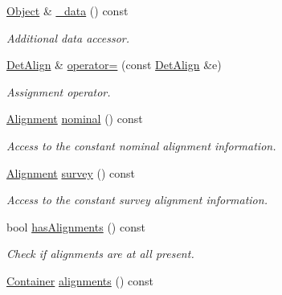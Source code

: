 \begin{DoxyCompactItemize}
\hyperlink{class_d_d4hep_1_1_geometry_1_1_det_element_object}{Object} \& \hyperlink{class_d_d4hep_1_1_alignments_1_1_det_align_ad21cb4ae966882e2b2b3ec268475b82a}{\_\-data} () const 
\begin{DoxyCompactList}\small\item\em Additional data accessor. \item\end{DoxyCompactList}\item 
\hyperlink{class_d_d4hep_1_1_alignments_1_1_det_align}{DetAlign} \& \hyperlink{class_d_d4hep_1_1_alignments_1_1_det_align_a9672376d598c4e583163a1f46f7817d0}{operator=} (const \hyperlink{class_d_d4hep_1_1_alignments_1_1_det_align}{DetAlign} \&e)
\begin{DoxyCompactList}\small\item\em Assignment operator. \item\end{DoxyCompactList}\item 
\hyperlink{class_d_d4hep_1_1_alignments_1_1_alignment}{Alignment} \hyperlink{class_d_d4hep_1_1_alignments_1_1_det_align_a32509c66001a245a250aea41ab717cb2}{nominal} () const 
\begin{DoxyCompactList}\small\item\em Access to the constant nominal alignment information. \item\end{DoxyCompactList}\item 
\hyperlink{class_d_d4hep_1_1_alignments_1_1_alignment}{Alignment} \hyperlink{class_d_d4hep_1_1_alignments_1_1_det_align_adbf0dea0867ee6179de59e58c36d300d}{survey} () const 
\begin{DoxyCompactList}\small\item\em Access to the constant survey alignment information. \item\end{DoxyCompactList}\item 
bool \hyperlink{class_d_d4hep_1_1_alignments_1_1_det_align_a2a82c5cc1e3a35618b6e5fb74d93cffd}{hasAlignments} () const 
\begin{DoxyCompactList}\small\item\em Check if alignments are at all present. \item\end{DoxyCompactList}\item 
\hyperlink{class_d_d4hep_1_1_alignments_1_1_container}{Container} \hyperlink{class_d_d4hep_1_1_alignments_1_1_det_align_ad2d4b23bcf8c7bd32ac279c35538c29f}{alignments} () const 

\end{DoxyCompactItemize}
